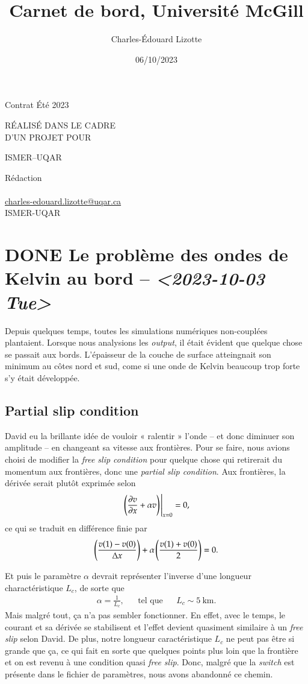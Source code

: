 \documentclass[10pt]{article}
\author{Charles-Édouard Lizotte}
\date{06/10/2023}
\title{Carnet de bord, Université McGill}
\makeatletter
\numberwithin{equation}{section}
\newcommand{\pt}{\hspace{1pt}} %
\newcommand{\mytitlepage}{
\begin{titlepage}
\begin{center}
{\Large Contrat Été 2023 \par}
\vspace{2cm}
{\Large \MakeUppercase{\thetitle} \par}
\vspace{2cm}
RÉALISÉ DANS LE CADRE\\ D'UN PROJET POUR \par
\vspace{2cm}
{\Large ISMER--UQAR \par}
\vspace{2cm}
{\thedate}
\end{center}
\vfill
Rédaction \\
{\theauthor}\\
\url{charles-edouard.lizotte@uqar.ca}\\
ISMER-UQAR
\end{titlepage}
}
\makeatother
\begin{document}
\mytitlepage
\tableofcontents\newpage

\section{{\bfseries\sffamily DONE} Le problème des ondes de Kelvin au bord -- \textit{<2023-10-03 Tue>}}
\label{sec:org93e1c30}
Depuis quelques temps, toutes les simulations numériques non-couplées plantaient.
Lorsque nous analysions les \emph{output}, il était évident que quelque chose se passait aux bords.
L'épaisseur de la couche de surface atteingnait son minimum au côtes nord et sud, come si une onde de Kelvin beaucoup trop forte s'y était développée.

\subsection{Partial slip condition}
\label{sec:org9eb7de7}
David eu la brillante idée de vouloir « ralentir » l'onde -- et donc diminuer son amplitude -- en changeant sa vitesse aux frontières.
Pour se faire, nous avions choisi de modifier la \emph{free slip condition} pour quelque chose qui retirerait du momentum aux frontières, donc une \emph{partial slip condition}.
Aux frontières, la dérivée serait plutôt exprimée selon
\begin{equation}
   \eval{\qty(\pdv{v}{x} + \alpha v)\pt}_{x=0} = 0,
\end{equation}
ce qui se traduit en différence finie par
\begin{equation}
   \qty(\frac{v(1) - v(0)}{\Delta x}) + \alpha\pt\qty( \frac{v(1)+v(0)}{2}) = 0.
\end{equation}

Et puis le paramètre \(\alpha\) devrait représenter l'inverse d'une longueur charactéristique \(L_c\), de sorte que
\begin{align}
   && \alpha = \frac{1}{L_c}, && \text{tel que} && L_c \sim 5\ \text{km}. && 
\end{align}
Mais malgré tout, ça n'a pas sembler fonctionner.
En effet, avec le temps, le courant et sa dérivée se stabilisent et l'effet devient quasiment similaire à un \emph{free slip} selon David.
De plus, notre longueur caractéristique \(L_c\) ne peut pas être si grande que ça, ce qui fait en sorte que quelques points plus loin que la frontière et on est revenu à une condition quasi \emph{free slip}.
Donc, malgré que la \emph{switch} est présente dans le fichier de paramètres, nous avons abandonné ce chemin.
\end{document}
